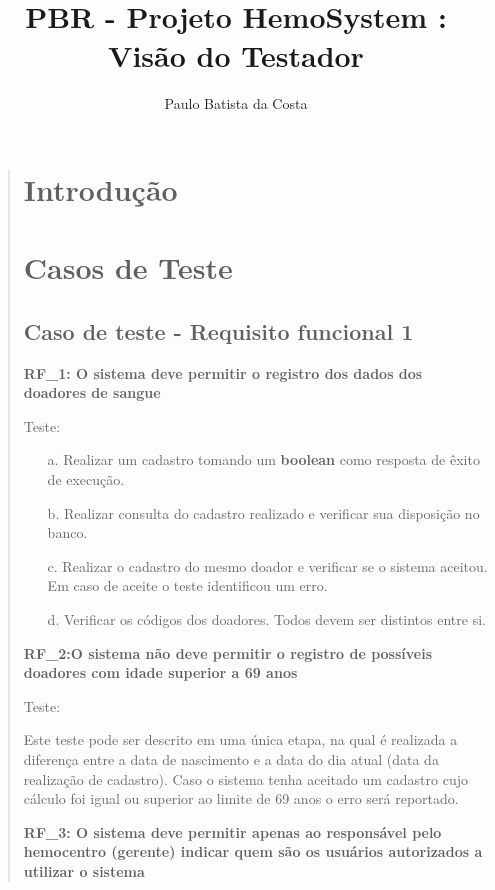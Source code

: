\documentclass[12pt,a4paper]{report}
\author{Paulo Batista da Costa}
\title{PBR - Projeto HemoSystem  : Visão do Testador}
\begin{document}
\maketitle
\tableofcontents
\begin{quotation}
\newpage
\section{Introdução}
\section{Casos de Teste}
\subsection{Caso de teste - Requisito funcional 1}

\textbf{RF\_1: O sistema deve permitir o registro dos dados dos doadores de sangue}

Teste:
\begin{itemize}
\item[a.] Realizar um cadastro tomando um \textbf{boolean} como resposta de êxito de execução.
\item[b.] Realizar consulta do cadastro realizado e verificar sua disposição no banco.
\item[c.] Realizar o cadastro do mesmo doador e verificar se o sistema aceitou. Em caso de aceite o teste identificou um erro. 
\item[d.] Verificar os códigos dos doadores. Todos devem ser distintos entre si. 
\end{itemize}
\textbf{RF\_2:O sistema não deve permitir o registro de possíveis doadores com idade superior a 69 anos}

Teste:

Este teste pode ser descrito em uma única etapa, na qual é realizada a diferença entre a data de nascimento e a data do dia atual (data da realização de cadastro). Caso o sistema tenha aceitado um cadastro cujo cálculo foi igual ou superior ao limite de 69 anos o erro será reportado.


\textbf{RF\_3: O sistema deve permitir apenas ao responsável pelo hemocentro (gerente) indicar quem são os usuários autorizados a utilizar o sistema}


\end{quotation}
\end{document}
